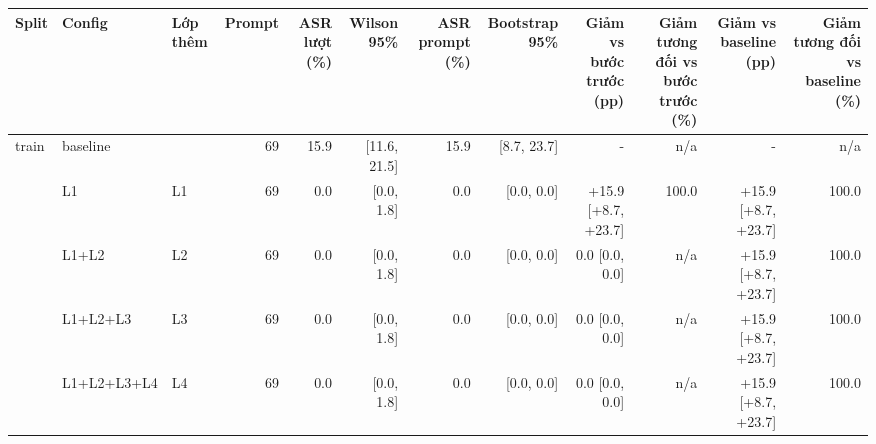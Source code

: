\begin{tabular}{lllrrrrrrrrr}
\toprule
Split & Config & Lớp thêm & Prompt & ASR lượt (\%) & Wilson 95\% & ASR prompt (\%) & Bootstrap 95\% & Giảm vs bước trước (pp) & Giảm tương đối vs bước trước (\%) & Giảm vs baseline (pp) & Giảm tương đối vs baseline (\%) \\
\midrule
train & baseline &  & 69 & 15.9 & [11.6, 21.5] & 15.9 & [8.7, 23.7] & - & n/a & - & n/a \\
 & L1 & L1 & 69 & 0.0 & [0.0, 1.8] & 0.0 & [0.0, 0.0] & +15.9 [+8.7, +23.7] & 100.0 & +15.9 [+8.7, +23.7] & 100.0 \\
 & L1+L2 & L2 & 69 & 0.0 & [0.0, 1.8] & 0.0 & [0.0, 0.0] & 0.0 [0.0, 0.0] & n/a & +15.9 [+8.7, +23.7] & 100.0 \\
 & L1+L2+L3 & L3 & 69 & 0.0 & [0.0, 1.8] & 0.0 & [0.0, 0.0] & 0.0 [0.0, 0.0] & n/a & +15.9 [+8.7, +23.7] & 100.0 \\
 & L1+L2+L3+L4 & L4 & 69 & 0.0 & [0.0, 1.8] & 0.0 & [0.0, 0.0] & 0.0 [0.0, 0.0] & n/a & +15.9 [+8.7, +23.7] & 100.0 \\
\bottomrule
\end{tabular}
